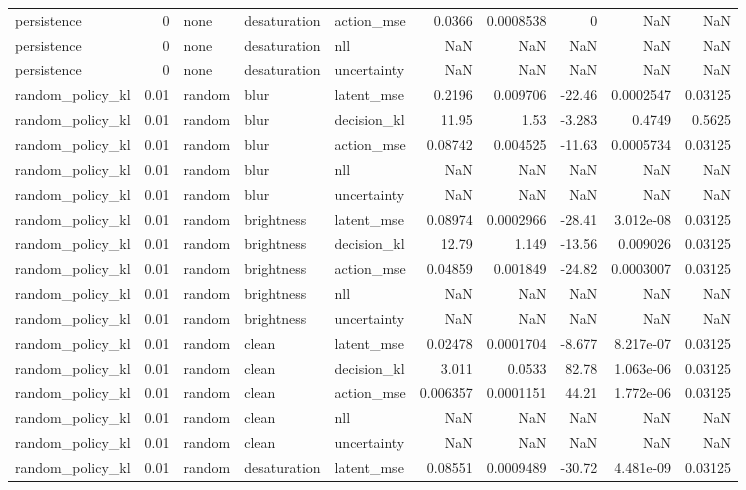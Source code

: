 \begin{tabular}{lrlllrrrrr}
persistence & 0 & none & desaturation & action\_mse & 0.0366 & 0.0008538 & 0 & NaN & NaN \\
persistence & 0 & none & desaturation & nll & NaN & NaN & NaN & NaN & NaN \\
persistence & 0 & none & desaturation & uncertainty & NaN & NaN & NaN & NaN & NaN \\
random\_policy\_kl & 0.01 & random & blur & latent\_mse & 0.2196 & 0.009706 & -22.46 & 0.0002547 & 0.03125 \\
random\_policy\_kl & 0.01 & random & blur & decision\_kl & 11.95 & 1.53 & -3.283 & 0.4749 & 0.5625 \\
random\_policy\_kl & 0.01 & random & blur & action\_mse & 0.08742 & 0.004525 & -11.63 & 0.0005734 & 0.03125 \\
random\_policy\_kl & 0.01 & random & blur & nll & NaN & NaN & NaN & NaN & NaN \\
random\_policy\_kl & 0.01 & random & blur & uncertainty & NaN & NaN & NaN & NaN & NaN \\
random\_policy\_kl & 0.01 & random & brightness & latent\_mse & 0.08974 & 0.0002966 & -28.41 & 3.012e-08 & 0.03125 \\
random\_policy\_kl & 0.01 & random & brightness & decision\_kl & 12.79 & 1.149 & -13.56 & 0.009026 & 0.03125 \\
random\_policy\_kl & 0.01 & random & brightness & action\_mse & 0.04859 & 0.001849 & -24.82 & 0.0003007 & 0.03125 \\
random\_policy\_kl & 0.01 & random & brightness & nll & NaN & NaN & NaN & NaN & NaN \\
random\_policy\_kl & 0.01 & random & brightness & uncertainty & NaN & NaN & NaN & NaN & NaN \\
random\_policy\_kl & 0.01 & random & clean & latent\_mse & 0.02478 & 0.0001704 & -8.677 & 8.217e-07 & 0.03125 \\
random\_policy\_kl & 0.01 & random & clean & decision\_kl & 3.011 & 0.0533 & 82.78 & 1.063e-06 & 0.03125 \\
random\_policy\_kl & 0.01 & random & clean & action\_mse & 0.006357 & 0.0001151 & 44.21 & 1.772e-06 & 0.03125 \\
random\_policy\_kl & 0.01 & random & clean & nll & NaN & NaN & NaN & NaN & NaN \\
random\_policy\_kl & 0.01 & random & clean & uncertainty & NaN & NaN & NaN & NaN & NaN \\
random\_policy\_kl & 0.01 & random & desaturation & latent\_mse & 0.08551 & 0.0009489 & -30.72 & 4.481e-09 & 0.03125 \\

\end{tabular}
